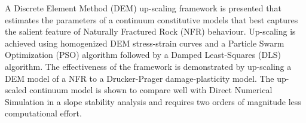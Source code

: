 %

 A Discrete Element Method (DEM) up-scaling framework is presented that estimates the parameters of a continuum constitutive models that best captures the salient feature of Naturally Fractured Rock (NFR) behaviour. Up-scaling is achieved using homogenized DEM stress-strain curves and a Particle Swarm Optimization (PSO) algorithm followed by a Damped Least-Squares (DLS) algorithm. The effectiveness of the framework is demonstrated by up-scaling a DEM model of a NFR to a Drucker-Prager damage-plasticity model. The up-scaled continuum model is shown to compare well with Direct Numerical Simulation in a slope stability analysis and requires two orders of magnitude less computational effort.
